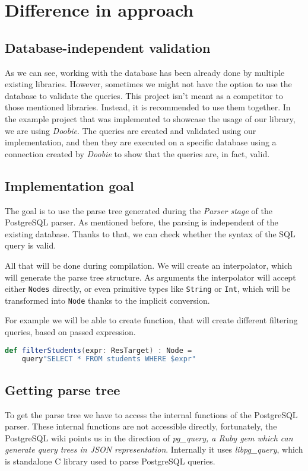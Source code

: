\section{Difference in approach}
\subsection{Database-independent validation}
As we can see, working with the database has been already done by multiple existing libraries. However, sometimes we might not have the option to use the database to validate the queries. This project isn't meant as a competitor to those mentioned libraries. Instead, it is recommended to use them together. In the example project that was implemented to showcase the usage of our library, we are using \textit{Doobie}. The queries are created and validated using our implementation, and then they are executed on a specific database using a connection created by \textit{Doobie} to show that the queries are, in fact, valid.

\subsection{Implementation goal}
The goal is to use the parse tree generated during the \textit{Parser stage} of the PostgreSQL parser. As mentioned before, the parsing is independent of the existing database. Thanks to that, we can check whether the syntax of the SQL query is valid. 

All that will be done during compilation. We will create an interpolator, which will generate the parse tree structure. As arguments the interpolator will accept either \texttt{Nodes} directly, or even primitive types like \texttt{String} or \texttt{Int}, which will be transformed into \texttt{Node} thanks to the implicit conversion. 

For example we will be able to create function, that will create different filtering queries, based on passed expression. 
\begin{lstlisting}[language=scala, basicstyle=\ttfamily, showstringspaces=false, caption={Example of \texttt{query} interpolator usage}]
def filterStudents(expr: ResTarget) : Node = 
    query"SELECT * FROM students WHERE $expr"
\end{lstlisting}

\subsection{Getting parse tree}
To get the parse tree we have to access the internal functions of the PostgreSQL parser. These internal functions are not accessible directly, fortunately, the PostgreSQL\cite{Postgres wiki} wiki points us in the direction of \textit{pg\_query, a Ruby gem which can generate query trees in JSON representation}. Internally it uses \textit{libpg\_query}, which is standalone C library used to parse PostgreSQL queries.

